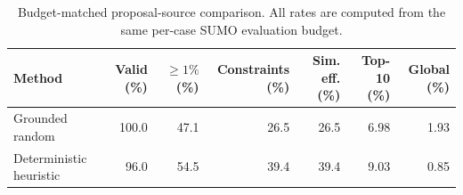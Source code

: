 \begin{table}[!ht]
    \caption{Budget-matched proposal-source comparison. All rates are computed from the same per-case SUMO evaluation budget.}
    \label{tab:proposal-source-comparison}
    \begin{center}
    \begin{tabular}{lrrrrrr}
        \hline
        Method & Valid (\%) & $\geq1\%$ (\%) & Constraints (\%) & Sim. eff. (\%) & Top-10 (\%) & Global (\%) \\
        \hline
        Grounded random & 100.0 & 47.1 & 26.5 & 26.5 & 6.98 & 1.93 \\
        Deterministic heuristic & 96.0 & 54.5 & 39.4 & 39.4 & 9.03 & 0.85 \\
        \hline
    \end{tabular}
    \end{center}
\end{table}
